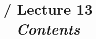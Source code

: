 \renewcommand{\prevlecture}{12 }
\renewcommand{\thislecture}{13 }
\renewcommand{\nextlecture}{14 }

%
%

\title[\modulename / Lecture \thislecture]
{
  \modulename / Lecture \thislecture \\
  {\it Contents}\\
}



\begin{frame}[plain]
  \titlepage
\end{frame}


